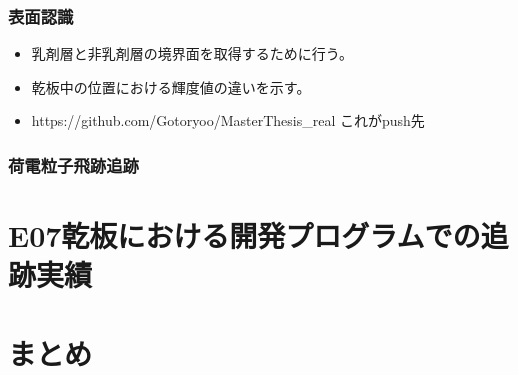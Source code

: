 \documentclass[12pt,a4paper]{jarticle}
\begin{document}
\subsubsection{表面認識}
\begin{itemize}
    \item 乳剤層と非乳剤層の境界面を取得するために行う。
    \item 乾板中の位置における輝度値の違いを示す。
    \item https://github.com/Gotoryoo/MasterThesis_real これがpush先
\end{itemize}
\subsubsection{荷電粒子飛跡追跡}

\newpage
\section{E07乾板における開発プログラムでの追跡実績}

\newpage
\section{まとめ}
\end{document}
